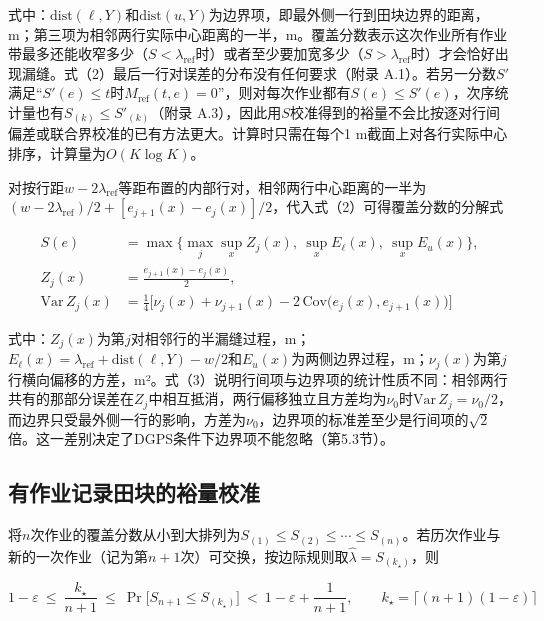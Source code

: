 \documentclass[preprint,12pt,number,sort&compress]{elsarticle}
\begin{document}
式中：\(\mathrm{dist}(\ell,Y)\)和\(\mathrm{dist}(u,Y)\)为边界项，即最外侧一行到田块边界的距离，m；第三项为相邻两行实际中心距离的一半，m。覆盖分数表示这次作业所有作业带最多还能收窄多少（\(S<\lambda_\mathrm{ref}\)时）或者至少要加宽多少（\(S>\lambda_\mathrm{ref}\)时）才会恰好出现漏缝。式（2）最后一行对误差的分布没有任何要求（附录 A.1）。若另一分数\(S'\)满足``\(S'(e)\le t\)时\(M_\mathrm{ref}(t,e)=0\)''，则对每次作业都有\(S(e)\le S'(e)\)，次序统计量也有\(S_{(k)}\le S'_{(k)}\)（附录 A.3），因此用\(S\)校准得到的裕量不会比按逐对行间偏差或联合界校准的已有方法更大。计算时只需在每个1 m截面上对各行实际中心排序，计算量为\(O(K\log K)\)。

对按行距\(w-2\lambda_\mathrm{ref}\)等距布置的内部行对，相邻两行中心距离的一半为\((w-2\lambda_\mathrm{ref})/2+[e_{j+1}(x)-e_j(x)]/2\)，代入式（2）可得覆盖分数的分解式

\begin{equation}
\begin{aligned}
S(e)&=\max\Big\{\max_{j}\sup_{x}Z_j(x),\ \sup_{x}E_\ell(x),\ \sup_{x}E_u(x)\Big\},\\
Z_j(x)&=\frac{e_{j+1}(x)-e_j(x)}{2},\\
\mathrm{Var}\,Z_j(x)&=\frac14\Big[\nu_j(x)+\nu_{j+1}(x)-2\,\mathrm{Cov}\big(e_j(x),e_{j+1}(x)\big)\Big]
\end{aligned}
\end{equation}

式中：\(Z_j(x)\)为第\(j\)对相邻行的半漏缝过程，m；\(E_\ell(x)=\lambda_\mathrm{ref}+\mathrm{dist}(\ell,Y)-w/2\)和\(E_u(x)\)为两侧边界过程，m；\(\nu_j(x)\)为第\(j\)行横向偏移的方差，m²。式（3）说明行间项与边界项的统计性质不同：相邻两行共有的那部分误差在\(Z_j\)中相互抵消，两行偏移独立且方差均为\(\nu_0\)时\(\mathrm{Var}\,Z_j=\nu_0/2\)，而边界只受最外侧一行的影响，方差为\(\nu_0\)，边界项的标准差至少是行间项的\(\sqrt2\)倍。这一差别决定了DGPS条件下边界项不能忽略（第5.3节）。

\subsection{有作业记录田块的裕量校准}

将\(n\)次作业的覆盖分数从小到大排列为\(S_{(1)}\le S_{(2)}\le\cdots\le S_{(n)}\)。若历次作业与新的一次作业（记为第\(n+1\)次）可交换，按边际规则取\(\hat\lambda=S_{(k_\star)}\)，则

\begin{equation}
1-\varepsilon\ \le\ \frac{k_\star}{n+1}\ \le\ \Pr\big[S_{n+1}\le S_{(k_\star)}\big]\ <\ 1-\varepsilon+\frac{1}{n+1},\qquad k_\star=\big\lceil(n+1)(1-\varepsilon)\big\rceil
\end{equation}
\end{document}

